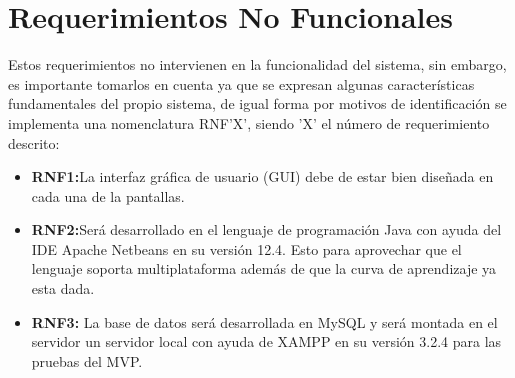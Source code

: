 \section{Requerimientos No Funcionales}
Estos requerimientos no intervienen en la funcionalidad del sistema, sin embargo, es importante tomarlos en cuenta ya que se expresan algunas características fundamentales del propio sistema, de igual forma por motivos de identificación se implementa una nomenclatura RNF'X', siendo 'X' el número de requerimiento descrito:
\begin{itemize}
	\item \textbf{RNF1:}La interfaz gráfica de usuario (GUI) debe de estar bien diseñada en cada una de la pantallas.
	\item \textbf{RNF2:}Será desarrollado en el lenguaje de programación Java con ayuda del IDE Apache Netbeans en su versión 12.4. Esto para aprovechar que el lenguaje soporta multiplataforma además de que la curva de aprendizaje ya esta dada. 
	\item \textbf{RNF3:} La base de datos será desarrollada en MySQL y será montada en el servidor un servidor local con ayuda de XAMPP en su versión 3.2.4 para las pruebas del MVP. 
\end{itemize}